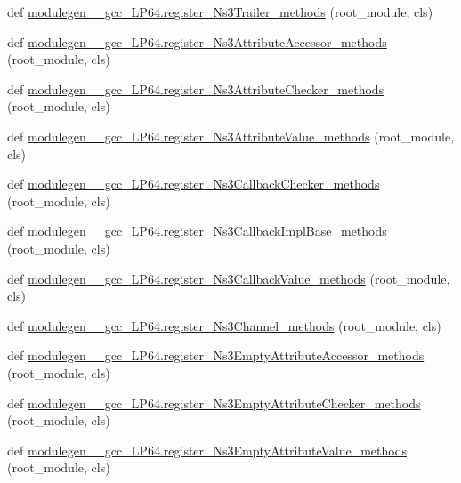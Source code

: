 \begin{DoxyCompactItemize}
\item 
def \hyperlink{namespacemodulegen____gcc__LP64_a79f6f84947747209adf07fee76a18188}{modulegen\+\_\+\+\_\+gcc\+\_\+\+L\+P64.\+register\+\_\+\+Ns3\+Trailer\+\_\+methods} (root\+\_\+module, cls)
\item 
def \hyperlink{namespacemodulegen____gcc__LP64_a88b38d1f62a9078cdbfc0f0d77a01866}{modulegen\+\_\+\+\_\+gcc\+\_\+\+L\+P64.\+register\+\_\+\+Ns3\+Attribute\+Accessor\+\_\+methods} (root\+\_\+module, cls)
\item 
def \hyperlink{namespacemodulegen____gcc__LP64_a7a7d7cb7b6a065a93209b09c08d1c096}{modulegen\+\_\+\+\_\+gcc\+\_\+\+L\+P64.\+register\+\_\+\+Ns3\+Attribute\+Checker\+\_\+methods} (root\+\_\+module, cls)
\item 
def \hyperlink{namespacemodulegen____gcc__LP64_a91d88e3bac410892f68a8f1bfd117d79}{modulegen\+\_\+\+\_\+gcc\+\_\+\+L\+P64.\+register\+\_\+\+Ns3\+Attribute\+Value\+\_\+methods} (root\+\_\+module, cls)
\item 
def \hyperlink{namespacemodulegen____gcc__LP64_a1ef896a5bde844de40d219e98ceb0cee}{modulegen\+\_\+\+\_\+gcc\+\_\+\+L\+P64.\+register\+\_\+\+Ns3\+Callback\+Checker\+\_\+methods} (root\+\_\+module, cls)
\item 
def \hyperlink{namespacemodulegen____gcc__LP64_a27471f48136ec47282f70d414c0f7b6a}{modulegen\+\_\+\+\_\+gcc\+\_\+\+L\+P64.\+register\+\_\+\+Ns3\+Callback\+Impl\+Base\+\_\+methods} (root\+\_\+module, cls)
\item 
def \hyperlink{namespacemodulegen____gcc__LP64_a08b703ec5906729a642f77b58b43c8d8}{modulegen\+\_\+\+\_\+gcc\+\_\+\+L\+P64.\+register\+\_\+\+Ns3\+Callback\+Value\+\_\+methods} (root\+\_\+module, cls)
\item 
def \hyperlink{namespacemodulegen____gcc__LP64_a8152d8ba5a6f1d5b869cf79767d9633e}{modulegen\+\_\+\+\_\+gcc\+\_\+\+L\+P64.\+register\+\_\+\+Ns3\+Channel\+\_\+methods} (root\+\_\+module, cls)
\item 
def \hyperlink{namespacemodulegen____gcc__LP64_a5885028edb9b0cbbdf4f75d1388d6b19}{modulegen\+\_\+\+\_\+gcc\+\_\+\+L\+P64.\+register\+\_\+\+Ns3\+Empty\+Attribute\+Accessor\+\_\+methods} (root\+\_\+module, cls)
\item 
def \hyperlink{namespacemodulegen____gcc__LP64_aa52eca018e0116d17b4c6c2798dcee71}{modulegen\+\_\+\+\_\+gcc\+\_\+\+L\+P64.\+register\+\_\+\+Ns3\+Empty\+Attribute\+Checker\+\_\+methods} (root\+\_\+module, cls)
\item 
def \hyperlink{namespacemodulegen____gcc__LP64_a86864e6a4eb56d909f7b4550592ead3b}{modulegen\+\_\+\+\_\+gcc\+\_\+\+L\+P64.\+register\+\_\+\+Ns3\+Empty\+Attribute\+Value\+\_\+methods} (root\+\_\+module, cls)

\end{DoxyCompactItemize}
